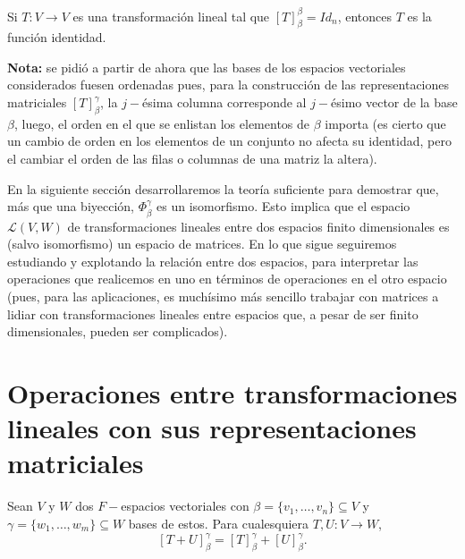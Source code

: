 \QEDB
\vspace{0.2cm}


\begin{cor}
Si $T: V \longrightarrow V$ es una transformación lineal
tal que $[T]_{\beta}^{\beta} = Id_{n}$, entonces $T$ es la función
identidad.
\end{cor}






\textbf{Nota:} se pidió a partir de ahora que las bases de los
espacios vectoriales considerados fuesen ordenadas pues,
para la construcción de las representaciones matriciales 
$[T]_{\beta}^{\gamma}$, la $j-$ésima columna corresponde al
$j-$ésimo vector de la base $\beta$, luego, el orden en el que se
enlistan los elementos de $\beta$ importa (es cierto que un cambio
de orden en los elementos de un conjunto no afecta su identidad,
pero el cambiar el orden de las filas o columnas de una matriz la 
altera).

En la siguiente sección desarrollaremos la teoría suficiente
para demostrar que, más que una biyección, $\Phi_{\beta}^{\gamma}$
es un isomorfismo. Esto implica que el espacio
$\mathcal{L}(V, W)$ de transformaciones lineales entre
dos espacios finito dimensionales es 
(salvo isomorfismo) un espacio de matrices. En lo que sigue
seguiremos estudiando y explotando la relación entre dos espacios,
para interpretar las operaciones que realicemos en uno en
términos de operaciones en el otro espacio (pues, para las aplicaciones,
es muchísimo más sencillo trabajar con matrices a lidiar
con transformaciones lineales entre espacios que, a pesar de ser
finito dimensionales, pueden ser complicados).

\section{Operaciones entre transformaciones lineales con sus representaciones matriciales}

\begin{prop}
Sean
$V$ y $W$ dos $F-$espacios vectoriales con $\beta = \{ v_{1}, \ldots , 
v_{n} \} \subseteq V$ y 
$\gamma = \{ w_{1}, \ldots , w_{m}\} \subseteq W$ bases de estos. 
Para cualesquiera $T, U :V \longrightarrow W$, 
\begin{equation}
	\label{eq: suma de matrices transf lin}
	[T + U]_{\beta}^{\gamma} = [T]_{\beta}^{\gamma} + 
[U]_{\beta}^{\gamma}.
\end{equation}
\end{prop}

